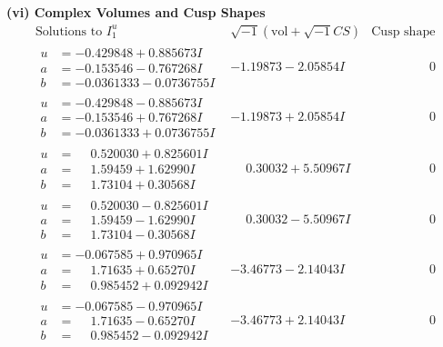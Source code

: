 \documentclass[1p]{elsarticle_modified}
\theoremstyle{definition}
\newcommand{\I}{\sqrt{-1}}
\begin{document}
\newpage\flushleft \textbf{(vi) Complex Volumes and Cusp Shapes}
$$\begin{array}{c|c|c}  
\text{Solutions to }I^u_{1}& \I (\text{vol} + \sqrt{-1}CS) & \text{Cusp shape}\\
 \hline 
\begin{aligned}
u &= -0.429848 + 0.885673 I \\
a &= -0.153546 - 0.767268 I \\
b &= -0.0361333 - 0.0736755 I\end{aligned}
 & -1.19873 - 2.05854 I & \phantom{-0.000000 } 0 \\ \hline\begin{aligned}
u &= -0.429848 - 0.885673 I \\
a &= -0.153546 + 0.767268 I \\
b &= -0.0361333 + 0.0736755 I\end{aligned}
 & -1.19873 + 2.05854 I & \phantom{-0.000000 } 0 \\ \hline\begin{aligned}
u &= \phantom{-}0.520030 + 0.825601 I \\
a &= \phantom{-}1.59459 + 1.62990 I \\
b &= \phantom{-}1.73104 + 0.30568 I\end{aligned}
 & \phantom{-}0.30032 + 5.50967 I & \phantom{-0.000000 } 0 \\ \hline\begin{aligned}
u &= \phantom{-}0.520030 - 0.825601 I \\
a &= \phantom{-}1.59459 - 1.62990 I \\
b &= \phantom{-}1.73104 - 0.30568 I\end{aligned}
 & \phantom{-}0.30032 - 5.50967 I & \phantom{-0.000000 } 0 \\ \hline\begin{aligned}
u &= -0.067585 + 0.970965 I \\
a &= \phantom{-}1.71635 + 0.65270 I \\
b &= \phantom{-}0.985452 + 0.092942 I\end{aligned}
 & -3.46773 - 2.14043 I & \phantom{-0.000000 } 0 \\ \hline\begin{aligned}
u &= -0.067585 - 0.970965 I \\
a &= \phantom{-}1.71635 - 0.65270 I \\
b &= \phantom{-}0.985452 - 0.092942 I\end{aligned}
 & -3.46773 + 2.14043 I & \phantom{-0.000000 } 0 \\ \hline\begin{aligned}

\end{aligned}
\end{array}$$
\end{document}
